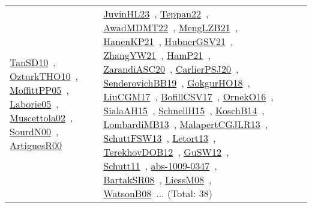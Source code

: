 {\begin{longtable}{lp{3cm}>{\raggedright\arraybackslash}p{6cm}>{\raggedright\arraybackslash}p{6cm}>{\raggedright\arraybackslash}p{8cm}}
\href{../works/TanSD10.pdf}{TanSD10}~\cite{TanSD10}, \href{../works/OzturkTHO10.pdf}{OzturkTHO10}~\cite{OzturkTHO10}, \href{../works/MoffittPP05.pdf}{MoffittPP05}~\cite{MoffittPP05}, \href{../works/Laborie05.pdf}{Laborie05}~\cite{Laborie05}, \href{../works/Muscettola02.pdf}{Muscettola02}~\cite{Muscettola02}, \href{../works/SourdN00.pdf}{SourdN00}~\cite{SourdN00}, \href{../works/ArtiguesR00.pdf}{ArtiguesR00}~\cite{ArtiguesR00} & \href{../works/JuvinHL23.pdf}{JuvinHL23}~\cite{JuvinHL23}, \href{../works/Teppan22.pdf}{Teppan22}~\cite{Teppan22}, \href{../works/AwadMDMT22.pdf}{AwadMDMT22}~\cite{AwadMDMT22}, \href{../works/MengLZB21.pdf}{MengLZB21}~\cite{MengLZB21}, \href{../works/HanenKP21.pdf}{HanenKP21}~\cite{HanenKP21}, \href{../works/HubnerGSV21.pdf}{HubnerGSV21}~\cite{HubnerGSV21}, \href{../works/ZhangYW21.pdf}{ZhangYW21}~\cite{ZhangYW21}, \href{../works/HamP21.pdf}{HamP21}~\cite{HamP21}, \href{../works/ZarandiASC20.pdf}{ZarandiASC20}~\cite{ZarandiASC20}, \href{../works/CarlierPSJ20.pdf}{CarlierPSJ20}~\cite{CarlierPSJ20}, \href{../works/SenderovichBB19.pdf}{SenderovichBB19}~\cite{SenderovichBB19}, \href{../works/GokgurHO18.pdf}{GokgurHO18}~\cite{GokgurHO18}, \href{../works/LiuCGM17.pdf}{LiuCGM17}~\cite{LiuCGM17}, \href{../works/BofillCSV17.pdf}{BofillCSV17}~\cite{BofillCSV17}, \href{../works/OrnekO16.pdf}{OrnekO16}~\cite{OrnekO16}, \href{../works/SialaAH15.pdf}{SialaAH15}~\cite{SialaAH15}, \href{../works/SchnellH15.pdf}{SchnellH15}~\cite{SchnellH15}, \href{../works/KoschB14.pdf}{KoschB14}~\cite{KoschB14}, \href{../works/LombardiMB13.pdf}{LombardiMB13}~\cite{LombardiMB13}, \href{../works/MalapertCGJLR13.pdf}{MalapertCGJLR13}~\cite{MalapertCGJLR13}, \href{../works/SchuttFSW13.pdf}{SchuttFSW13}~\cite{SchuttFSW13}, \href{../works/Letort13.pdf}{Letort13}~\cite{Letort13}, \href{../works/TerekhovDOB12.pdf}{TerekhovDOB12}~\cite{TerekhovDOB12}, \href{../works/GuSW12.pdf}{GuSW12}~\cite{GuSW12}, \href{../works/Schutt11.pdf}{Schutt11}~\cite{Schutt11}, \href{../works/abs-1009-0347.pdf}{abs-1009-0347}~\cite{abs-1009-0347}, \href{../works/BartakSR08.pdf}{BartakSR08}~\cite{BartakSR08}, \href{../works/LiessM08.pdf}{LiessM08}~\cite{LiessM08}, \href{../works/WatsonB08.pdf}{WatsonB08}~\cite{WatsonB08}... (Total: 38)\\

\end{longtable}}
